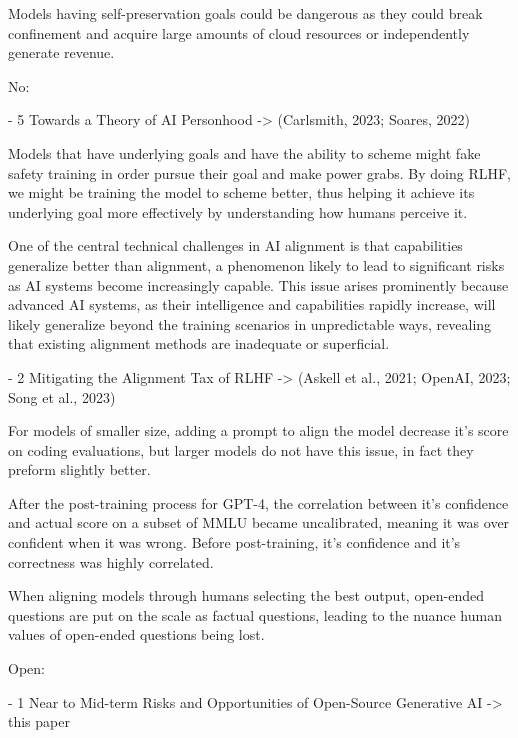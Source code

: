 \citep{shevlane_model_2023}

Models having self-preservation goals could be dangerous as they could break confinement and acquire large amounts of cloud resources or independently generate revenue.

No:

- 5 Towards a Theory of AI Personhood -> (Carlsmith, 2023; Soares, 2022)
\citep{carlsmith_scheming_2023}

Models that have underlying goals and have the ability to scheme might fake safety training in order pursue their goal and make power grabs. By doing RLHF, we might be training the model to scheme better, thus helping it achieve its underlying goal more effectively by understanding how humans perceive it.

\citep{soares_central_2022}

One of the central technical challenges in AI alignment is that capabilities generalize better than alignment, a phenomenon likely to lead to significant risks as AI systems become increasingly capable. This issue arises prominently because advanced AI systems, as their intelligence and capabilities rapidly increase, will likely generalize beyond the training scenarios in unpredictable ways, revealing that existing alignment methods are inadequate or superficial.

- 2 Mitigating the Alignment Tax of RLHF -> (Askell et al., 2021; OpenAI, 2023; Song et al., 2023)
\citep{askell_general_2021}

For models of smaller size, adding a prompt to align the model decrease it's score on coding evaluations, but larger models do not have this issue, in fact they preform slightly better.

\citep{openai_gpt_4_2023}

After the post-training process for GPT-4, the correlation between it's confidence and actual score on a subset of MMLU became uncalibrated, meaning it was over confident when it was wrong. Before post-training, it's confidence and it's correctness was highly correlated.

\citep{song_reward_2023}

When aligning models through humans selecting the best output, open-ended questions are put on the scale as factual questions, leading to the nuance human values of open-ended questions being lost.

Open: 

- 1 Near to Mid-term Risks and Opportunities of Open-Source Generative AI -> this paper
\citep{eiras_near_2024}

